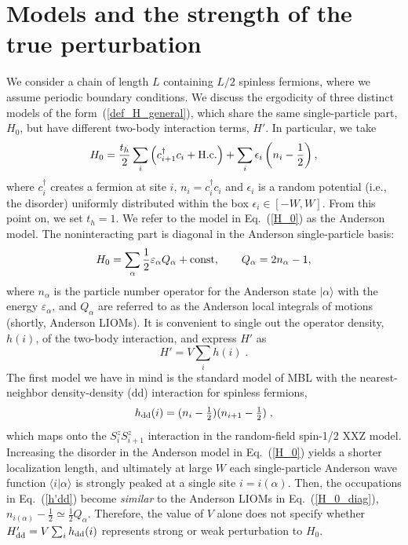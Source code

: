 \documentclass[twocolumn,pre,superscriptaddress,10pt,aps,floatfix]{revtex4-1}
\begin{document}
\section{Models and the strength of  the true perturbation} \label{sec:models}
 
We consider a chain of length $L$ containing $L/2$  spinless fermions, where we assume periodic boundary conditions. We discuss the ergodicity of three distinct models of the form~(\ref{def_H_general}), which share the same single-particle part, $H_0$, but have different two-body interaction terms, $H'$. In particular, we take
\begin{equation}
H_0=\frac{t_h}{2} \sum_i \left(c^{\dagger}_{i+1} c_i +{\rm H.c.} \right) +\sum_i \epsilon_i \left(n_i-\frac{1}{2}\right), \label{H_0}
\end{equation}
where $c^{\dagger}_i$ creates a fermion at site  $i$, $n_i=c^{\dagger}_i c_i$ and $\epsilon_i$ is a random potential (i.e., the disorder) uniformly distributed within the box $\epsilon_i \in [-W,W]$. From this point on, we set $t_h=1$.
We refer to the model in Eq.~(\ref{H_0}) as the Anderson model.
The noninteracting part is diagonal in the Anderson single-particle basis:
\begin{equation}
H_0= \sum_{\alpha} \frac{1}{2} \varepsilon_{\alpha}  Q_{\alpha} +{\rm const}, \quad \quad   Q_{\alpha}=2 n_{\alpha} -1, \label{H_0_diag}
\end{equation}     
where $n_{\alpha}$ is the particle number operator for the Anderson state $|\alpha \rangle$ with the energy $\varepsilon_{\alpha}$, and $Q_{\alpha}$ are referred to as the Anderson local integrals of motions (shortly, Anderson LIOMs).  It is convenient to single out the operator density, $h(i)$, of the two-body interaction, and express $H'$ as
\begin{equation}
H' = V \sum_i h(i)\;. \label{h'}
\end{equation}
The first model we have in mind is the standard model of MBL with the nearest-neighbor density-density (dd) interaction for spinless fermions,
\begin{equation}
h_{\rm dd}(i)  =  (n_i-\tfrac{1}{2})(n_{i+1}-\tfrac{1}{2})\;, \label{h'dd}
\end{equation}
which maps onto the $S^z_i S^z_{i+1}$ interaction in the random-field spin-1/2 XXZ model.
Increasing the disorder in the Anderson model in Eq.~(\ref{H_0}) yields a shorter localization length, and ultimately at large $W$ each single-particle Anderson wave function $\langle i | \alpha \rangle$ is strongly peaked at a single site $i=i(\alpha)$.
Then, the occupations in Eq.~(\ref{h'dd}) become {\em similar} to the Anderson LIOMs in Eq.~(\ref{H_0_diag}), \mbox{$ n_{i(\alpha)}-\frac{1}{2} \simeq \frac{1}{2} Q_{\alpha}$}. Therefore, the value of $V$ alone does not specify whether  \mbox{$H'_{\rm dd} = V \sum_i h_{\rm dd}(i)$}  
represents strong or weak perturbation to $H_0$. 
\end{document}
